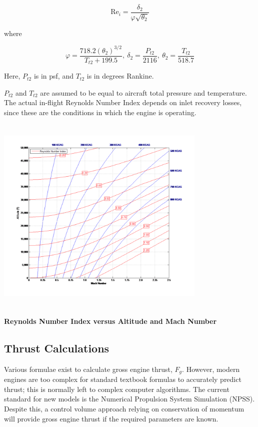 \documentclass[
]{book}
\begin{document}
\[\mathrm{Re}_{i} = \frac{\delta_{2}}{\varphi\sqrt{\theta_{2}}}\]

where

\[\varphi = \frac{718.2\left( \theta_{2} \right)^{3/2}}{T_{t2} + 199.5},\ \delta_{2} = \frac{P_{t2}}{2116},\ \theta_{2} = \frac{T_{t2}}{518.7}\]

Here, \(P_{t2}\) is in psf, and \(T_{t2}\) is in degrees Rankine.

\(P_{t2}\) and \(T_{t2}\) are assumed to be equal to aircraft total pressure
and temperature. The actual in-flight Reynolds Number Index depends on inlet
recovery losses, since these are the conditions in which the engine is operating.

\includegraphics[width=3.9658in,height=3.79851in]{media/17/image13.svg}

\textbf{Reynolds Number Index versus Altitude and Mach Number}

\hypertarget{thrust-calculations}{%
\subsection{Thrust Calculations}\label{thrust-calculations}}

Various formulae exist to calculate gross engine thrust, \(F_g\). However,
modern engines are too complex for standard textbook formulas to accurately
predict thrust; this is normally left to complex computer algorithms. The
current standard for new models is the Numerical Propulsion System Simulation
(NPSS). Despite this, a control volume approach relying on conservation of
momentum will provide gross engine thrust if the required parameters are known.
\end{document}
